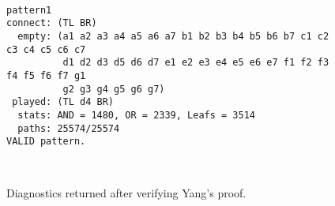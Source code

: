 \begin{figure}[ht]
{\footnotesize 
\ \hfill 
\begin{verbatim}
pattern1           
connect: (TL BR)  
  empty: (a1 a2 a3 a4 a5 a6 a7 b1 b2 b3 b4 b5 b6 b7 c1 c2 c3 c4 c5 c6 c7
          d1 d2 d3 d5 d6 d7 e1 e2 e3 e4 e5 e6 e7 f1 f2 f3 f4 f5 f6 f7 g1
          g2 g3 g4 g5 g6 g7) 
 played: (TL d4 BR) 
  stats: AND = 1480, OR = 2339, Leafs = 3514
  paths: 25574/25574 
VALID pattern.
\end{verbatim}
\hfill \  
}
\caption{Diagnostics returned after verifying Yang's proof.}
\label{fig:p1.diag}
\end{figure}
